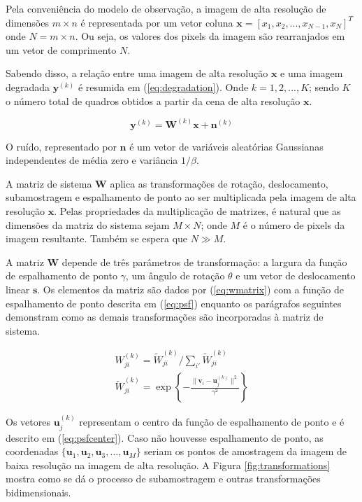 \documentclass[12pt,openright,oneside,a4paper,english,brazil]{abntex2}
\begin{document}
Pela conveniência do modelo de observação, a imagem de alta resolução de dimensões $m \times n$ é representada por um vetor coluna $\mathbf{x} = [x_1, x_2, ... , x_{N-1}, x_N]^T$ onde $N ={} m \times n$. Ou seja, os valores dos pixels da imagem são rearranjados em um vetor de comprimento $N$.

Sabendo disso, a relação entre uma imagem de alta resolução $\mathbf{x}$ e uma imagem degradada $\mathbf{y}^{(k)}$ é resumida em (\ref{eq:degradation}). Onde $k = 1,2,...,K$; sendo $K$ o número total de quadros obtidos a partir da cena de alta resolução $\mathbf{x}$.

\begin{equation}
	\label{eq:degradation}
	\mathbf{y}^{(k)} = \mathbf{W}^{(k)}\mathbf{x} + \mathbf{n}^{(k)}
\end{equation}

O ruído, representado por $\mathbf{n}$ é um vetor de variáveis aleatórias Gaussianas independentes de média zero e variância $1/\beta$.

A matriz de sistema $\mathbf{W}$ aplica as transformações de rotação, deslocamento, subamostragem e espalhamento de ponto ao ser multiplicada pela imagem de alta resolução $\mathbf{x}$.
Pelas propriedades da multiplicação de matrizes, é natural que as dimensões da matriz do sistema sejam $M \times N$; onde $M$ é o número de pixels da imagem resultante.
Também se espera que $N \gg M$.

A matriz $\mathbf{W}$ depende de três parâmetros de transformação: a largura da função de espalhamento de ponto $\gamma$, um ângulo de rotação $\theta$ e um vetor de deslocamento linear $\mathbf{s}$.
Os elementos da matriz são dados por (\ref{eq:wmatrix}) com a função de espalhamento de ponto descrita em (\ref{eq:psf}) enquanto os parágrafos seguintes demonstram como as demais transformações são incorporadas à matriz de sistema.

\begin{gather}
	\label{eq:wmatrix}
	W^{(k)}_{ji} = \widetilde{W}^{(k)}_{ji} / \sum_{i'} \widetilde{W}^{(k)}_{ji} \\
	\label{eq:psf}
	\widetilde{W}^{(k)}_{ji} = \exp \left\{- \frac{\|\mathbf{v}_i - \mathbf{u}^{(k)}_j\|^2}{\gamma^2} \right\}
\end{gather}

Os vetores $\mathbf{u}^{(k)}_j$ representam o centro da função de espalhamento de ponto e é descrito em (\ref{eq:psfcenter}).
Caso não houvesse espalhamento de ponto, as coordenadas $\{\mathbf{u}_1, \mathbf{u}_2,\mathbf{u}_3,..., \mathbf{u}_M\}$ seriam os pontos de amostragem da imagem de baixa resolução na imagem de alta resolução.
A Figura \ref{fig:transformations} mostra como se dá o processo de subamostragem e outras transformações bidimensionais.
\end{document}
